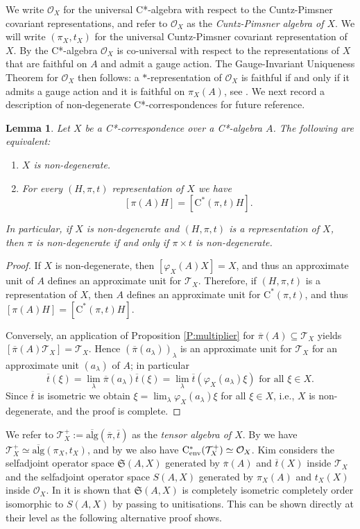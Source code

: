 \documentclass[11pt, draft]{amsart}
\numberwithin{equation}{section}
\theoremstyle{plain}
\newtheorem{lemma}[theorem]{Lemma}
\theoremstyle{definition}
\theoremstyle{remark}
\renewcommand{\O}{{\mathcal{O}}}
\newcommand{\T}{{\mathcal{T}}}
\def\la{\lambda}
\newcommand\vphi{\varphi}
\newcommand{\fS}{{\mathfrak{S}}}
\newcommand{\foral}{\text{ for all }}
\newcommand{\ca}{\mathrm{C}^*}
\newcommand{\cenv}{\mathrm{C}^*_{\textup{env}}}
\newcommand{\ol}{\overline}
\begin{document}
We write $\O_X$ for the universal C*-algebra with respect to the Cuntz-Pimsner covariant representations, and refer to $\O_X$ as the \emph{Cuntz-Pimsner algebra of $X$}.
We will write $(\pi_X, t_X)$ for the universal Cuntz-Pimsner covariant representation of $X$. 
By \cite[Proposition 7.14]{Kat07} the C*-algebra $\O_X$ is co-universal with respect to the representations of $X$ that are faithful on $A$ and admit a gauge action.
The Gauge-Invariant Uniqueness Theorem for $\O_X$ then follows: a $*$-representation of $\O_X$ is faithful if and only if it admits a gauge action and it is faithful on $\pi_X(A)$, see \cite[Theorem 6.4]{Kat04}.
We next record a description of non-degenerate C*-correspondences for future reference.

\begin{lemma}\label{L:nondeg}
Let $X$ be a C*-correspondence over a C*-algebra $A$. 
The following are equivalent:
\begin{enumerate}
\item $X$ is non-degenerate.
\item For every $(H,\pi,t)$ representation of $X$ we have 
\[
[\pi(A)H]=[\ca(\pi,t)H].
\]
\end{enumerate}
In particular, if $X$ is non-degenerate and $(H,\pi,t)$ is a representation of $X$, then $\pi$ is non-degenerate if and only if $\pi\times t$ is non-degenerate.
\end{lemma}

\begin{proof}
If $X$ is non-degenerate, then $[\vphi_X(A)X] = X$, and thus an approximate unit of $A$ defines an approximate unit for $\T_X$.
Therefore, if $(H,\pi,t)$ is a representation of $X$, then $A$ defines an approximate unit for $\ca(\pi,t)$, and thus $[\pi(A)H]=[\ca(\pi,t)H]$.

Conversely, an application of Proposition \ref{P:multiplier} for $\ol{\pi}(A) \subseteq \T_X$ yields $[\ol{\pi}(A) \T_X] = \T_X$. 
Hence $(\ol{\pi}(a_\la))_\la$ is an approximate unit for $\T_X$ for an approximate unit $(a_\la)$ of $A$; in particular 
\[
\ol{t}(\xi) = \lim_\la \ol{\pi}(a_\la) \ol{t}(\xi) = \lim_\la \ol{t}(\vphi_X(a_\la)\xi) \foral \xi \in X.
\]
Since $\ol{t}$ is isometric we obtain $\xi = \lim_\la \vphi_X(a_\la)\xi$ for all $\xi \in X$, i.e., $X$ is non-degenerate, and the proof is complete.
\end{proof}

We refer to $\T_X^+ := \ol{\text{alg}}(\ol{\pi},\ol{t})$ as the \emph{tensor algebra of $X$}.
By \cite[Lemma 3.5]{KK06} we have $\T_X^+ \simeq \ol{\text{alg}}(\pi_X, t_X)$, and by \cite[Theorem 3.7]{KK06} we also have  $\cenv(\T_X^+) \simeq \O_X$. 
Kim \cite{Kim21} considers the selfadjoint operator space $\fS(A,X)$ generated by $\ol{\pi}(A)$ and $\ol{t}(X)$ inside $\T_X$ and the selfadjoint operator space $S(A,X)$ generated by $\pi_X(A)$ and $t_X(X)$ inside $\O_X$. 
In \cite[Proposition 2.5]{Kim21} it is shown that $\fS(A,X)$ is completely isometric completely order isomorphic to $S(A,X)$ by passing to unitisations.
This can be shown directly at their level as the following alternative proof shows.
\end{document}
